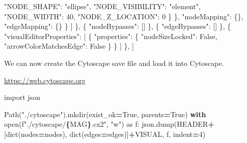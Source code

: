 \documentclass[
]{book}
\newenvironment{Shaded}{\begin{snugshade}}{\end{snugshade}}
\newcommand{\BuiltInTok}[1]{#1}
\newcommand{\ControlFlowTok}[1]{\textcolor[rgb]{0.13,0.29,0.53}{\textbf{#1}}}
\newcommand{\DecValTok}[1]{\textcolor[rgb]{0.00,0.00,0.81}{#1}}
\newcommand{\ImportTok}[1]{#1}
\newcommand{\NormalTok}[1]{#1}
\newcommand{\OperatorTok}[1]{\textcolor[rgb]{0.81,0.36,0.00}{\textbf{#1}}}
\newcommand{\SpecialCharTok}[1]{\textcolor[rgb]{0.81,0.36,0.00}{\textbf{#1}}}
\newcommand{\SpecialStringTok}[1]{\textcolor[rgb]{0.31,0.60,0.02}{#1}}
\newcommand{\StringTok}[1]{\textcolor[rgb]{0.31,0.60,0.02}{#1}}
\newcommand{\VariableTok}[1]{\textcolor[rgb]{0.00,0.00,0.00}{#1}}
\begin{document}
\begin{Shaded}
\begin{Highlighting}[numbers=left,,]
                        \StringTok{"NODE\_SHAPE"}\NormalTok{: }\StringTok{"ellipse"}\NormalTok{,}
                        \StringTok{"NODE\_VISIBILITY"}\NormalTok{: }\StringTok{"element"}\NormalTok{,}
                        \StringTok{"NODE\_WIDTH"}\NormalTok{: }\DecValTok{40}\NormalTok{,}
                        \StringTok{"NODE\_Z\_LOCATION"}\NormalTok{: }\DecValTok{0}
\NormalTok{                    \}}
\NormalTok{                \},}
                \StringTok{"nodeMapping"}\NormalTok{: \{\},}
                \StringTok{"edgeMapping"}\NormalTok{: \{\}}
\NormalTok{            \}}
\NormalTok{        ]}
\NormalTok{    \},}
\NormalTok{    \{}
        \StringTok{"nodeBypasses"}\NormalTok{: []}
\NormalTok{    \},}
\NormalTok{    \{}
        \StringTok{"edgeBypasses"}\NormalTok{: []}
\NormalTok{    \},}
\NormalTok{    \{}
        \StringTok{"visualEditorProperties"}\NormalTok{: [}
\NormalTok{            \{}
                \StringTok{"properties"}\NormalTok{: \{}
                    \StringTok{"nodeSizeLocked"}\NormalTok{: }\VariableTok{False}\NormalTok{,}
                    \StringTok{"arrowColorMatchesEdge"}\NormalTok{: }\VariableTok{False}
\NormalTok{                \}}
\NormalTok{            \}}
\NormalTok{        ]}
\NormalTok{    \},}
\NormalTok{]}
\end{Highlighting}
\end{Shaded}

We can now create the Cytoscape save file and load it into Cytoscape.

\url{https://web.cytoscape.org}

\begin{Shaded}
\begin{Highlighting}[numbers=left,,]
\ImportTok{import}\NormalTok{ json}

\NormalTok{Path(}\StringTok{"./cytoscape"}\NormalTok{).mkdir(exist\_ok}\OperatorTok{=}\VariableTok{True}\NormalTok{, parents}\OperatorTok{=}\VariableTok{True}\NormalTok{)}
\ControlFlowTok{with} \BuiltInTok{open}\NormalTok{(}\SpecialStringTok{f"./cytoscape/}\SpecialCharTok{\{}\NormalTok{MAG}\SpecialCharTok{\}}\SpecialStringTok{.cx2"}\NormalTok{, }\StringTok{"w"}\NormalTok{) }\ImportTok{as}\NormalTok{ f:}
\NormalTok{    json.dump(HEADER}\OperatorTok{+}\NormalTok{[}\BuiltInTok{dict}\NormalTok{(nodes}\OperatorTok{=}\NormalTok{nodes), }\BuiltInTok{dict}\NormalTok{(edges}\OperatorTok{=}\NormalTok{edges)]}\OperatorTok{+}\NormalTok{VISUAL, f, indent}\OperatorTok{=}\DecValTok{4}\NormalTok{)}
\end{Highlighting}
\end{Shaded}
\end{document}
